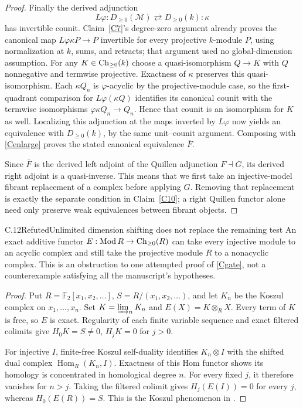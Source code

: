 \begin{proof}
Finally the derived adjunction
\[
 L\varphi:D_{\geq0}(\mathcal M)\rightleftarrows D_{\geq0}(k):\kappa
\]
has invertible counit. Claim~\ref{C7}'s degree-zero argument already proves the canonical map $L\varphi\kappa P\to P$ invertible for every projective $k$-module $P$, using normalization at $k$, sums, and retracts; that argument used no global-dimension assumption. For any $K\in\operatorname{Ch}_{\geq0}(k)$ choose a quasi-isomorphism $Q\to K$ with $Q$ nonnegative and termwise projective. Exactness of $\kappa$ preserves this quasi-isomorphism. Each $\kappa Q_n$ is $\varphi$-acyclic by the projective-module case, so the first-quadrant comparison for $L\varphi(\kappa Q)$ identifies its canonical counit with the termwise isomorphisms $\varphi\kappa Q_n\to Q_n$. Hence that counit is an isomorphism for $K$ as well. Localizing this adjunction at the maps inverted by $L\varphi$ now yields an equivalence with $D_{\geq0}(k)$, by the same unit--counit argument. Composing with \eqref{Cenlarge} proves the stated canonical equivalence $\overline F$.

Since $\overline F$ is the derived left adjoint of the Quillen adjunction $F\dashv G$, its derived right adjoint is a quasi-inverse. This means that we first take an injective-model fibrant replacement of a complex before applying $G$. Removing that replacement is exactly the separate condition in Claim~\ref{C10}; a right Quillen functor alone need only preserve weak equivalences between fibrant objects.
\end{proof}

\begin{claim}{C.12}{Refuted}{Unlimited dimension shifting does not replace the remaining test}\label{C12}
An exact additive functor $E:\operatorname{Mod} R\to\operatorname{Ch}_{\geq0}(R)$ can take every injective module to an acyclic complex and still take the projective module $R$ to a nonacyclic complex. This is an obstruction to one attempted proof of \eqref{Cgate}, not a counterexample satisfying all the manuscript's hypotheses.
\end{claim}
\begin{proof}
Put $R=\mathbb F_2[x_1,x_2,\ldots]$, $S=R/(x_1,x_2,\ldots)$, and let $K_n$ be the Koszul complex on $x_1,\ldots,x_n$. Set $K=\varinjlim_nK_n$ and $E(X)=K\otimes_RX$. Every term of $K$ is free, so $E$ is exact. Regularity of each finite variable sequence and exact filtered colimits give $H_0K=S\ne0$, $H_jK=0$ for $j>0$.

For injective $I$, finite-free Koszul self-duality identifies $K_n\otimes I$ with the shifted dual complex $\operatorname{Hom}_R(K_n,I)$. Exactness of this Hom functor shows its homology is concentrated in homological degree $n$. For every fixed $j$, it therefore vanishes for $n>j$. Taking the filtered colimit gives $H_j(E(I))=0$ for every $j$, whereas $H_0(E(R))=S$. This is the Koszul phenomenon in \citet[Theorem 3.5]{Rickard2019}.
\end{proof}

